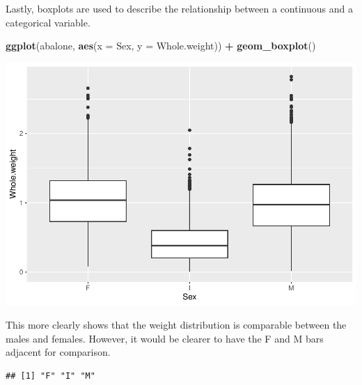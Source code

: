 \documentclass[
]{book}
\newenvironment{Shaded}{\begin{snugshade}}{\end{snugshade}}
\newcommand{\AttributeTok}[1]{\textcolor[rgb]{0.13,0.29,0.53}{#1}}
\newcommand{\FunctionTok}[1]{\textcolor[rgb]{0.13,0.29,0.53}{\textbf{#1}}}
\newcommand{\NormalTok}[1]{#1}
\newcommand{\OtherTok}[1]{\textcolor[rgb]{0.56,0.35,0.01}{#1}}
\newcommand{\SpecialCharTok}[1]{\textcolor[rgb]{0.81,0.36,0.00}{\textbf{#1}}}
\newcommand{\StringTok}[1]{\textcolor[rgb]{0.31,0.60,0.02}{#1}}
\begin{document}
Lastly, boxplots are used to describe the relationship between a continuous and a categorical variable.

\begin{Shaded}
\begin{Highlighting}[]
\FunctionTok{ggplot}\NormalTok{(abalone, }\FunctionTok{aes}\NormalTok{(}\AttributeTok{x =}\NormalTok{ Sex, }\AttributeTok{y =}\NormalTok{ Whole.weight)) }\SpecialCharTok{+}
  \FunctionTok{geom\_boxplot}\NormalTok{()}
\end{Highlighting}
\end{Shaded}

\includegraphics{_main_files/figure-latex/unnamed-chunk-50-1.pdf}

This more clearly shows that the weight distribution is comparable between the males and females. However, it would be clearer to have the F and M bars adjacent for comparison.

\begin{Shaded}
\end{Shaded}

\begin{verbatim}
## [1] "F" "I" "M"
\end{verbatim}

\begin{Shaded}
\end{Shaded}
\end{document}
